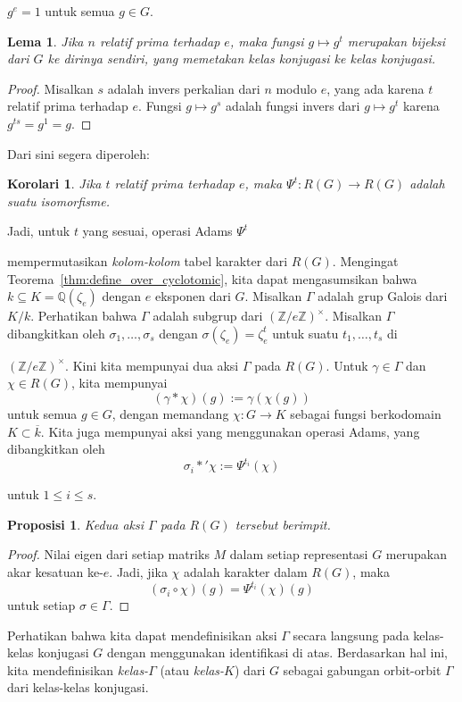 \documentclass[12pt]{article}
\theoremstyle{plain}
\newtheorem{lemma}[theorem]{Lema}
\newtheorem{proposition}[theorem]{Proposisi}
\newtheorem{corollary}[theorem]{Korolari}
\theoremstyle{definition}
\theoremstyle{remark}
\numberwithin{equation}{section}
\begin{document}
$g^e=1$ untuk semua $g \in G$.
\begin{lemma}
Jika $n$ relatif prima terhadap $e$,
maka fungsi $g \mapsto g^t$ merupakan bijeksi dari $G$ ke dirinya sendiri,
yang memetakan kelas konjugasi ke kelas konjugasi.

\end{lemma}
\begin{proof}
Misalkan $s$ adalah invers perkalian dari $n$ modulo $e$,
yang ada karena $t$ relatif prima terhadap $e$.
Fungsi $g \mapsto g^s$ adalah fungsi invers dari
$g \mapsto g^t$ karena $g^{ts}=g^1=g$.

\end{proof}

Dari sini segera diperoleh:
\begin{corollary}
Jika $t$ relatif prima terhadap $e$,
maka $\Psi^t : R(G) \to R(G)$ adalah suatu isomorfisme.

\end{corollary}
Jadi, untuk $t$ yang sesuai, operasi Adams $\Psi^t$

mempermutasikan \emph{kolom-kolom} tabel karakter dari $R(G)$.
Mengingat Teorema~\ref{thm:define_over_cyclotomic},
kita dapat mengasumsikan bahwa $k \subseteq K=\mathbb{Q}(\zeta_e)$
dengan $e$ eksponen dari $G$.
Misalkan $\Gamma$ adalah grup Galois dari $K/k$.
Perhatikan bahwa $\Gamma$ adalah subgrup dari
$(\mathbb{Z}/e\mathbb{Z})^\times$.
Misalkan $\Gamma$ dibangkitkan oleh $\sigma_1,\ldots,\sigma_s$
dengan $\sigma(\zeta_e)=\zeta_e^t$ untuk suatu $t_1,\ldots,t_s$ di

$(\mathbb{Z}/e\mathbb{Z})^\times$.
Kini kita mempunyai dua aksi $\Gamma$ pada $R(G)$.
Untuk $\gamma \in \Gamma$ dan $\chi \in R(G)$, kita mempunyai
\[
(\gamma \ast \chi)(g) := \gamma(\chi(g)) 
\]
untuk semua $g \in G$,
dengan memandang $\chi: G \to K$ sebagai fungsi berkodomain $K \subset
\overline{k}$.
Kita juga mempunyai aksi yang menggunakan operasi Adams,
yang dibangkitkan oleh
\[
\sigma_i \ast' \chi := \Psi^{t_i}(\chi)
\]

untuk $1 \le i \le s$.
\begin{proposition}
Kedua aksi $\Gamma$ pada $R(G)$ tersebut berimpit.

\end{proposition} 
\begin{proof}
Nilai eigen dari setiap matriks $M$ dalam setiap representasi $G$ merupakan
akar kesatuan ke-$e$.
Jadi, jika $\chi$ adalah karakter dalam $R(G)$, maka
\[
(\sigma_i \circ \chi)(g) = \Psi^{t_i}(\chi)(g)
\] 
untuk setiap $\sigma \in \Gamma$.

\end{proof}
Perhatikan bahwa kita dapat mendefinisikan aksi $\Gamma$ secara langsung pada kelas-kelas
konjugasi $G$ dengan menggunakan identifikasi di atas.
Berdasarkan hal ini, kita mendefinisikan \emph{kelas-$\Gamma$}
(atau \emph{kelas-$K$}) dari $G$ sebagai gabungan orbit-orbit $\Gamma$ dari
kelas-kelas konjugasi.
\end{document}
